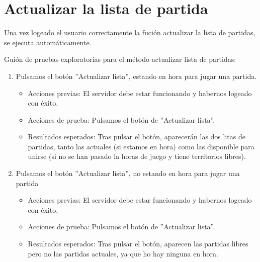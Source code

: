 \section{Actualizar la lista de partida}

Una vez logeado el usuario correctamente la fución actualizar la lista de partidas, se ejecuta automáticamente.

Guión de pruebas exploratorias para el método actualizar lista de partidas:

\begin{enumerate}
\item Pulsamos el botón ''Actualizar lista'', estando en hora para jugar una partida.
	\begin{itemize}
	\item Acciones previas: El servidor debe estar funcionando y habernos logeado con éxito.
	\item Acciones de prueba: Pulsamos el botón de ''Actualizar lista''.
	\item Resultados esperados: Tras pulsar el botón, aparecerán las dos litas de partidas, tanto las actuales (si estamos en hora) como las disponible para unirse (si no se han pasado la horas de juego y tiene territorios libres).
	\end{itemize}
\item Pulsamos el botón ''Actualizar lista'', no estando en hora para jugar una partida
	\begin{itemize}
	\item Acciones previas: El servidor debe estar funcionando y habernos logeado con éxito.
	\item Acciones de prueba: Pulsamos el botón de ''Actualizar lista''.
	\item Resultados esperados: Tras pulsar el botón, aparecen las partidas libres pero no las partidas actuales, ya que ho hay ninguna en hora.
	\end{itemize}
\end{enumerate}
